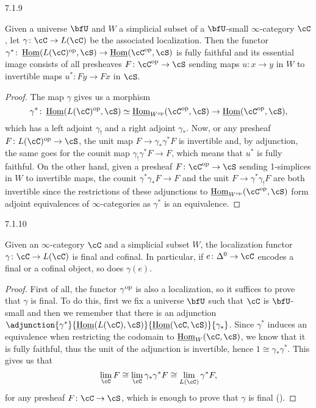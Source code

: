 \documentclass[a4paper,12pt]{scrartcl}
\begin{document}
\begin{prop}
  7.1.9

  Given a universe $\bfU$ and $W$ a simplicial subset of a $\bfU$-small
  $\infty$-category $\cC$, let $\gamma\colon\cC\rightarrow L(\cC)$ be the
  associated localization. Then the functor
  $\gamma^*\colon\Home(L(\cC)^{\op},\cS)\rightarrow\Home(\cC^{\op},\cS)$ is
  fully faithful and its essential image consists of all presheaves
  $F\colon\cC^{\op}\rightarrow\cS$ sending maps $u\colon x\rightarrow y$ in $W$
  to invertible maps $u^*\colon Fy\rightarrow Fx$ in $\cS$.
\end{prop}
\begin{proof}
  The map $\gamma$ gives us a morphism
  \[\gamma^*\colon\Home(L(\cC)^{\op},\cS)\simeq\Home_{W^{\op}}(\cC^{\op},\cS)\rightarrow\Home(\cC^{\op},\cS),\]
  which has a left adjoint $\gamma_!$ and a right adjoint $\gamma_*$. Now, or
  any presheaf $F\colon L(\cC)^{\op}\rightarrow\cS$, the unit map
  $F\rightarrow\gamma_*\gamma^*F$ is invertible and, by adjunction, the same
  goes for the counit map $\gamma_!\gamma^*F\rightarrow F$, which means that
  $u^*$ is fully faithful. On the other hand, given a presheaf
  $F\colon\cC^{\op}\rightarrow\cS$ sending 1-simplices in $W$ to invertible maps,
  the counit $\gamma^*\gamma_*F\rightarrow F$ and the unit
  $F\rightarrow\gamma^*\gamma_!F$ are both invertible since the restrictions of
  these adjunctions to $\Home_{W^{\op}}(\cC^{\op},\cS)$ form adjoint
  equivalences of $\infty$-categories as $\gamma^*$ is an equivalence.
\end{proof}

\begin{prop}\label{7110}
  7.1.10

  Given an $\infty$-category $\cC$ and a simplicial subset $W$, the localization
  functor $\gamma\colon\cC\rightarrow L(\cC)$ is final and cofinal. In
  particular, if $e\colon\Delta^0\rightarrow\cC$ encodes a final or a cofinal
  object, so does $\gamma(e)$.
\end{prop}
\begin{proof}
  First of all, the functor $\gamma^{\operatorname{op}}$ is also a localization, so it
  suffices to prove that $\gamma$ is final. To do this, first we fix a universe
  $\bfU$ such that $\cC$ is $\bfU$-small and then we remember that there
  is an adjunction
  $\adjunction{\gamma^*}{\Home(L(\cC),\cS)}{\Home(\cC,\cS)}{\gamma_*}$. Since
  $\gamma^*$ induces an equivalence when restricting the codomain to
  $\Home_W(\cC,\cS)$, we know that it is fully faithful, thus the unit of the
  adjunction is invertible, hence $1\cong\gamma_*\gamma^*$. This gives us that
  \[\lim_{\cC}F\cong\lim_{\cC}\gamma_*\gamma^*F\cong\lim_{L(\cC)}\gamma^*F,\]
  for any presheaf $F\colon\cC\rightarrow\cS$, which is enough to prove that
  $\gamma$ is final (\cite[Thm.\ 6.4.5]{Cis19}).
\end{proof}
\end{document}
